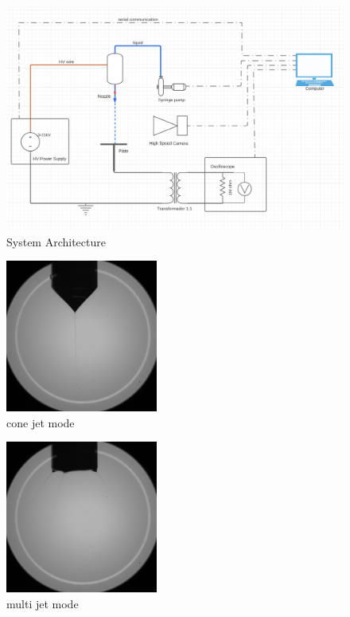 \begin{figure}[H]
    \center
    \includegraphics[width=12cm]{images/images_folder_1/system_design.png}
    \caption{System Architecture}
\end{figure}



\begin{multicols}{2}

    \begin{figure}[H]
        \center
        \includegraphics[width=5cm]{images/images_folder_3/conejetexample.png}
        \caption{cone jet mode}
    \end{figure}
    
    \begin{figure}[H]
        \center
        \includegraphics[width=5cm]{images/images_folder_3/multijetexample.png}
        \caption{multi jet mode}
    \end{figure}

    
\end{multicols}
